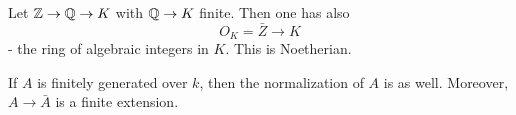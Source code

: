 \begin{example}
  Let $\mathbb Z \to \mathbb Q \to K$ with $\mathbb Q \to K$ finite.
  Then one has also
  \[ O_K = \bar Z \to K\]
  - the ring of algebraic integers in $K$. This is Noetherian.
\end{example}

\begin{theorem}[Nagata]
  If $A$ is finitely generated over $k$, then the normalization of $A$ is as well. Moreover,
  \( A \to \bar A\)
  is a finite extension.
\end{theorem}









